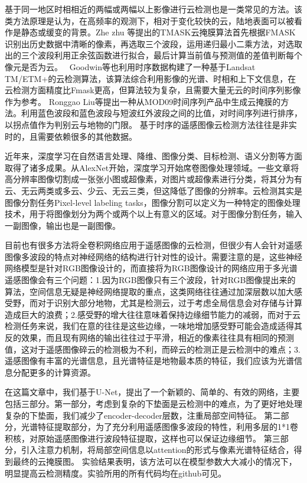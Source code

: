 \documentclass[UTF8]{ctexart}
\begin{document}
基于同一地区时相相近的两幅或两幅以上影像进行云检测也是一类常见的方法。该类方法原理是认为，在高频率的观测下，相对于变化较快的云，陆地表面可以被看作是静态或缓变的背景。Zhe zhu 等\cite{zhu2014automated}提出的TMASK云掩膜算法首先根据FMASK识别出历史数据中清晰的像素，再选取三个波段，运用递归最小二乘方法，对选取出的三个波段利用正余弦函数进行拟合，最后计算当前值与预测值的差值判断每个像元是否为云。 
Goodwin等\cite{goodwin2013cloud}也利用时序数据构建了一种基于Landsat TM/ETM+的云检测算法，该算法综合利用影像的光谱、时相和上下文信息，在云检测方面精度比Fmask更高，但算法较为复杂，且需要大量无云的时间序列影像作为参考。
Ronggao Liu等\cite{liu2013generation}提出一种从MOD09时间序列产品中生成云掩膜的方法。利用蓝色波段和蓝色波段与短波红外波段之间的比值，对时间序列进行排序，以拐点值作为判别云与地物的门限。
基于时序的遥感图像云检测方法往往是非实时的，且需要依赖很多的其他数据。

近年来，深度学习在自然语言处理、降维、图像分类、目标检测、语义分割等方面取得了诸多成果。从AlexNet开始，深度学习开始席卷图像处理领域。一些文章将高分辨率图像切割成一张张小图或超像素，对图片或超像素进行分类，将其分为有云、无云两类或多云、少云、无云三类，但这降低了图像的分辨率。云检测其实是图像分割任务Pixel-level labeling tasks，图像分割可以定义为一种特定的图像处理技术，用于将图像划分为两个或两个以上有意义的区域。对于图像分割任务，输入一副图像，输出也是一副图像。

目前也有很多方法将全卷积网络应用于遥感图像的云检测\cite{chai2019cloud, jeppesen2019cloud}，但很少有人会针对遥感图像多波段的特点对神经网络的结构进行针对性的设计。需要注意的是，这些神经网络模型是针对RGB图像设计的，而直接将为RGB图像设计的网络应用于多光谱遥感图像会有三个问题：1.因为RGB图像只有三个波段，针对RGB图像提出来的算法，空间信息无疑是神经网络提取的重点，这类网络往往通过加深层数以加大感受野，而对于识别大部分地物，尤其是检测云，过于考虑全局信息会对存储与计算造成巨大的浪费；2.感受野的增大往往意味着保持边缘细节能力的减弱，而对于云检测任务来说，我们在意的往往是这些边缘，一味地增加感受野可能会造成适得其反的效果，而且现有网络的输出往往过于平滑，相近的像素往往具有相同的预测值，这对于遥感图像碎云的检测极为不利，而碎云的检测正是云检测中的难点；3.遥感图像有丰富的光谱信息，且光谱特征是地物最本质的特征，我们应该为光谱信息分配更多的计算资源。

在这篇文章中，我们基于U-Net，提出了一个新颖的、简单的、有效的网络，主要包括三部分。第一部分，考虑到复杂的下垫面是云检测中的难点，为了更好地处理复杂的下垫面，我们减少了encoder-decoder层数，注重局部空间特征。
第二部分，光谱特征提取部分，为了充分利用遥感图像多波段的特性，利用多层的1*1卷积核，对原始遥感图像进行波段特征提取，这样也可以保证边缘细节。
第三部分，引入注意力机制，将局部空间信息以attention的形式与像素光谱特征结合，得到最终的云掩膜图。
实验结果表明，该方法可以在模型参数大大减小的情况下，明显提高云检测精度。实验所用的所有代码均在github可见。
\end{document}
